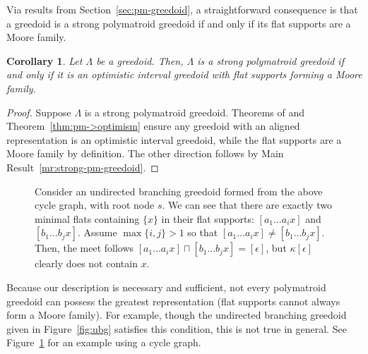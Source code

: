 \documentclass[11pt]{article}
\newtheorem{corollary}[theorem]{Corollary}
\newcommand{\glang}{\Lambda}
\begin{document}
Via results from Section~\ref{sec:pm-greedoid}, a straightforward consequence is that a greedoid is a strong polymatroid greedoid if and only if its flat supports are a Moore family.

\begin{corollary}\label{cor:strong-pm}
    Let $\glang$ be a greedoid.
    Then, $\glang$ is a strong polymatroid greedoid if and only if it is an optimistic interval greedoid with flat supports forming a Moore family.
\end{corollary}
\begin{proof}
    Suppose $\glang$ is a strong polymatroid greedoid.
    Theorems of \cite{korte1985polymatroid} and Theorem~\ref{thm:pm->optimism} ensure any greedoid with an aligned representation is an optimistic interval greedoid, while the flat supports are a Moore family by definition.
    The other direction follows by Main Result~\ref{mr:strong-pm-greedoid}.
\end{proof}

\begin{figure}[t!]
    \centering
    \scalebox{.8}{}
    \caption{
        Consider an undirected branching greedoid formed from the above cycle graph, with root node $s$.
        We can see that there are exactly two minimal flats containing $\{x\}$ in their flat supports: $[a_1\ldots a_i x]$ and $[b_1\ldots b_j x]$.
        Assume $\max\{i,j\} > 1$ so that $[a_1\ldots a_i x] \neq [b_1\ldots b_j x]$.
        Then, the meet follows $[a_1\ldots a_i x] \sqcap [b_1\ldots b_j x] = [\epsilon]$, but $\kappa[\epsilon]$ clearly does not contain $x$.
    }\label{fig:flat support-not-closed}
\end{figure}
Because our description is necessary and sufficient, not every polymatroid greedoid can possess the greatest representation (flat supports cannot always form a Moore family).
For example, though the undirected branching greedoid given in Figure~\ref{fig:ubg} satisfies this condition, this is not true in general.
See Figure~\ref{fig:flat support-not-closed} for an example using a cycle graph.
\end{document}
